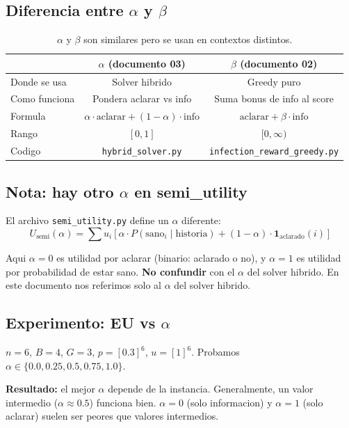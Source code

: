 \documentclass[11pt]{article}
\begin{document}
\subsection{Diferencia entre $\alpha$ y $\beta$}

\begin{table}[htbp]
  \centering
  \begin{tabular}{lcc}
    \toprule
     & $\alpha$ (documento 03) & $\beta$ (documento 02) \\
    \midrule
    Donde se usa & Solver hibrido & Greedy puro \\
    Como funciona & Pondera aclarar vs info & Suma bonus de info al score \\
    Formula & $\alpha \cdot \text{aclarar} + (1-\alpha) \cdot \text{info}$ & $\text{aclarar} + \beta \cdot \text{info}$ \\
    Rango & $[0, 1]$ & $[0, \infty)$ \\
    Codigo & \texttt{hybrid\_solver.py} & \texttt{infection\_reward\_greedy.py} \\
    \bottomrule
  \end{tabular}
  \caption{$\alpha$ y $\beta$ son similares pero se usan en contextos distintos.}
\end{table}

\subsection{Nota: hay otro $\alpha$ en semi\_utility}

El archivo \texttt{semi\_utility.py} define un $\alpha$ diferente:
$$U_{\text{semi}}(\alpha) = \sum u_i \left[ \alpha \cdot P(\text{sano}_i \mid \text{historia}) + (1-\alpha) \cdot \mathbf{1}_{\text{aclarado}}(i) \right]$$

Aqui $\alpha = 0$ es utilidad por aclarar (binario: aclarado o no),
y $\alpha = 1$ es utilidad por probabilidad de estar sano.
\textbf{No confundir} con el $\alpha$ del solver hibrido.
En este documento nos referimos solo al $\alpha$ del solver hibrido.

\subsection{Experimento: EU vs $\alpha$}

$n=6$, $B=4$, $G=3$, $p=[0.3]^6$, $u=[1]^6$.
Probamos $\alpha \in \{0.0, 0.25, 0.5, 0.75, 1.0\}$.

\textbf{Resultado:} el mejor $\alpha$ depende de la instancia.
Generalmente, un valor intermedio ($\alpha \approx 0.5$) funciona bien.
$\alpha = 0$ (solo informacion) y $\alpha = 1$ (solo aclarar)
suelen ser peores que valores intermedios.
\end{document}
